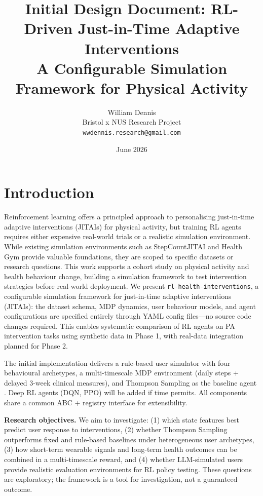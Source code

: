\documentclass[11pt,a4paper]{article}
\title{Initial Design Document: RL-Driven Just-in-Time Adaptive Interventions\\
\large A Configurable Simulation Framework for Physical Activity}
\author{William Dennis\\
Bristol x NUS Research Project\\
\texttt{wwdennis.research@gmail.com}}
\date{June 2026}
\begin{document}
\maketitle
\tableofcontents

\newpage

\section{Introduction}
\label{sec:intro}

Reinforcement learning offers a principled approach to personalising
just-in-time adaptive interventions (JITAIs) for physical activity, but
training RL agents requires either expensive real-world trials or a realistic
simulation environment. While existing simulation environments such as
StepCountJITAI \cite{karine2024stepcountjitai} and Health Gym
\cite{gateno2023healthgym} provide valuable foundations, they are scoped to
specific datasets or research questions. This work supports a cohort study on physical activity and health behaviour change, building a simulation framework to test intervention strategies before real-world deployment. We present \texttt{rl-health-interventions},
a configurable simulation framework for just-in-time adaptive interventions (JITAIs):
the dataset schema, MDP dynamics, user behaviour models, and agent configurations
are specified entirely through YAML config files---no source code changes
required. This enables systematic comparison of RL agents on PA intervention
tasks using synthetic data in Phase 1, with real-data integration planned for
Phase 2.

The initial implementation delivers a rule-based user simulator with four
behavioural archetypes, a multi-timescale MDP environment (daily steps +
delayed 3-week clinical measures), and Thompson Sampling as the baseline
agent \cite{karine2024stepcountjitai,klasnja2019heartsteps}. Deep RL agents
(DQN, PPO) will be added if time permits. All
components share a common ABC + registry interface for extensibility.

\textbf{Research objectives.} We aim to investigate: (1) which state features best predict user response to interventions, (2) whether Thompson Sampling outperforms fixed and rule-based baselines under heterogeneous user archetypes, (3) how short-term wearable signals and long-term health outcomes can be combined in a multi-timescale reward, and (4) whether LLM-simulated users provide realistic evaluation environments for RL policy testing. These questions are exploratory; the framework is a tool for investigation, not a guaranteed outcome.
\end{document}
